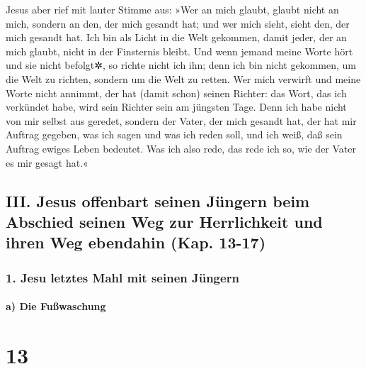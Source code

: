  Jesus aber rief mit lauter Stimme aus: »Wer an mich
glaubt, glaubt nicht an mich, sondern an den, der mich gesandt hat;
 und wer mich sieht, sieht den, der mich gesandt hat.
 Ich bin als Licht in die Welt gekommen, damit jeder, der
an mich glaubt, nicht in der Finsternis bleibt.  Und wenn
jemand meine Worte hört und sie nicht befolgt✲, so richte nicht ich ihn;
denn ich bin nicht gekommen, um die Welt zu richten, sondern um die Welt
zu retten.  Wer mich verwirft und meine Worte nicht
annimmt, der hat (damit schon) seinen Richter: das Wort, das ich
verkündet habe, wird sein Richter sein am jüngsten Tage. 
Denn ich habe nicht von mir selbst aus geredet, sondern der Vater, der
mich gesandt hat, der hat mir Auftrag gegeben, was ich sagen und was ich
reden soll,  und ich weiß, daß sein Auftrag ewiges Leben
bedeutet. Was ich also rede, das rede ich so, wie der Vater es mir
gesagt hat.«

\hypertarget{iii.-jesus-offenbart-seinen-juxfcngern-beim-abschied-seinen-weg-zur-herrlichkeit-und-ihren-weg-ebendahin-kap.-13-17}{%
\subsection{III. Jesus offenbart seinen Jüngern beim Abschied seinen Weg
zur Herrlichkeit und ihren Weg ebendahin (Kap.
13-17)}\label{iii.-jesus-offenbart-seinen-juxfcngern-beim-abschied-seinen-weg-zur-herrlichkeit-und-ihren-weg-ebendahin-kap.-13-17}}

\hypertarget{jesu-letztes-mahl-mit-seinen-juxfcngern}{%
\subsubsection{1. Jesu letztes Mahl mit seinen
Jüngern}\label{jesu-letztes-mahl-mit-seinen-juxfcngern}}

\hypertarget{a-die-fuuxdfwaschung}{%
\paragraph{a) Die Fußwaschung}\label{a-die-fuuxdfwaschung}}

\hypertarget{section-12}{%
\section{13}\label{section-12}}

